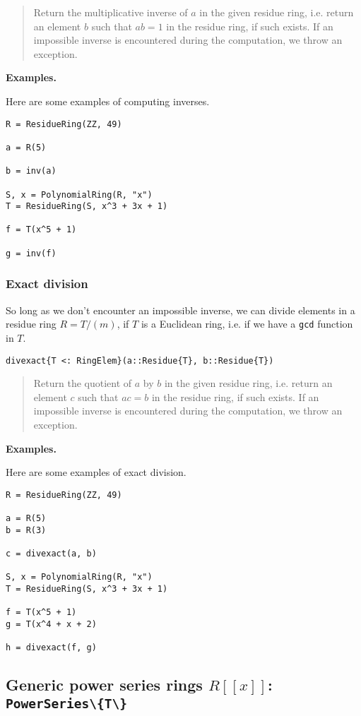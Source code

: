 \documentclass[a4paper,10pt]{article}
\newcommand{\code}{\lstinline}
\newcommand{\desc}[1]{\vspace{-3mm}\begin{quote}#1\end{quote}}
\begin{document}
\desc{Return the multiplicative inverse of $a$ in the given residue
ring, i.e. return an element $b$ such that $ab = 1$ in the residue ring,
if such exists. If an impossible inverse is encountered during the
computation, we throw an exception.}

\textbf{Examples.}

Here are some examples of computing inverses.

\begin{lstlisting}
R = ResidueRing(ZZ, 49)

a = R(5)

b = inv(a)

S, x = PolynomialRing(R, "x")
T = ResidueRing(S, x^3 + 3x + 1)

f = T(x^5 + 1)

g = inv(f)
\end{lstlisting}

\subsubsection{Exact division}

So long as we don't encounter an impossible inverse, we can
divide elements in a residue ring $R = T/(m)$, if $T$ is a
Euclidean ring, i.e. if we have a \code{gcd} function in $T$.

\begin{lstlisting}
divexact{T <: RingElem}(a::Residue{T}, b::Residue{T})
\end{lstlisting}

\desc{Return the quotient of $a$ by $b$ in the given residue
ring, i.e. return an element $c$ such that $ac = b$ in the residue ring,
if such exists. If an impossible inverse is encountered during the
computation, we throw an exception.}

\textbf{Examples.}

Here are some examples of exact division.

\begin{lstlisting}
R = ResidueRing(ZZ, 49)

a = R(5)
b = R(3)

c = divexact(a, b)

S, x = PolynomialRing(R, "x")
T = ResidueRing(S, x^3 + 3x + 1)

f = T(x^5 + 1)
g = T(x^4 + x + 2)

h = divexact(f, g)
\end{lstlisting}

\subsection{Generic power series rings $R[[x]]$: \code|PowerSeries\{T\}|}
\end{document}
